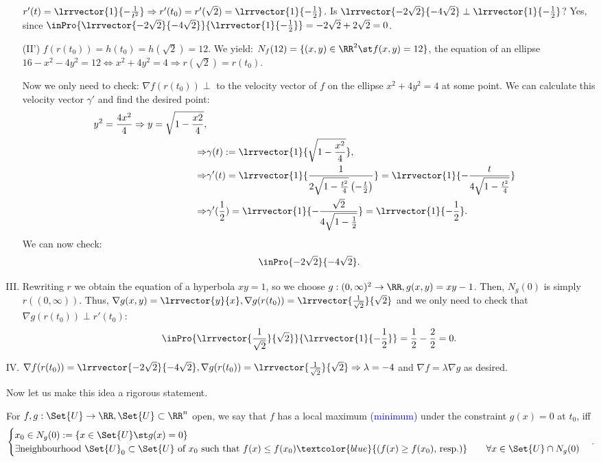 \begin{exam}
\begin{enumerate}[(I)]
  	$r'(t)=\lrrvector{1}{-\frac{1}{t^2}}\Rightarrow r'(t_0)=r'(\sqrt{2})=\lrrvector{1}{-\frac{1}{2}}$. Is $\lrrvector{-2\sqrt{2}}{-4\sqrt{2}}\perp\lrrvector{1}{-\frac{1}{2}}$?
  	Yes, since $\inPro{\lrrvector{-2\sqrt{2}}{-4\sqrt{2}}}{\lrrvector{1}{-\frac{1}{2}}}=-2\sqrt{2}+2\sqrt{2}=0$.
  	\item[(II')] $f(r(t_0))=h(t_0)=h(\sqrt{2})=12$. We yield: $N_f(12)=\{(x,y)\in\RR^2\st f(x,y)=12\}$, the equation of an ellipse $16-x^2-4y^2=12\Leftrightarrow x^2+4y^2=4\Rightarrow r(\sqrt{2})=r(t_0)$.\par 
  	Now we only need to check: $\nabla f(r(t_0))\perp$ to the velocity vector of $f$ on the ellipse $x^2+4y^2=4$ at some point. We can calculate this velocity vector $\gamma'$ and find the desired point: 
  	\begin{align*}
  	  y^2=\frac{4x^2}{4}\Rightarrow y=\sqrt{1-\frac{x2}{4}}, \\\Rightarrow&\gamma(t):=\lrrvector{1}{\sqrt{1-\frac{x^2}{4}}},\\ \Rightarrow&\gamma'(t)=\lrrvector{1}{\frac{1}{2\sqrt{1-\frac{t^2}{4}}\left(-\frac{t}{2}\right)}}=\lrrvector{1}{-\frac{t}{4\sqrt{1-\frac{t^2}{4}}}}\\\Rightarrow& \gamma'(\frac{1}{2})=\lrrvector{1}{-\frac{\sqrt{2}}{4\sqrt{1-\frac{1}{2}}}}=\lrrvector{1}{-\frac{1}{2}}.
  	\end{align*}
  	We can now check:
  	$$\inPro{-2\sqrt{2}}{-4\sqrt{2}}.$$
  	\item Rewriting $r$ we obtain the equation of a hyperbola $xy=1$, so we choose $g:(0,\infty)^2\to\RR, g(x,y)=xy-1$. Then, $N_g(0)$ is simply $r((0,\infty))$. Thus, $\nabla g(x,y)=\lrrvector{y}{x}, \nabla g(r(t_0))=\lrrvector{\frac{1}{\sqrt{2}}}{\sqrt{2}}$ and we only need to check that $\nabla g(r(t_0))\perp r'(t_0)$:
  	$$\inPro{\lrrvector{\frac{1}{\sqrt{2}}}{\sqrt{2}}}{\lrrvector{1}{-\frac{1}{2}}}=\frac{1}{2}-\frac{2}{2}=0.$$
  	\item $\nabla f(r(t_0))=\lrrvector{-2\sqrt{2}}{-4\sqrt{2}}, \nabla g(r(t_0))=\lrrvector{\frac{1}{\sqrt{2}}}{\sqrt{2}}\Rightarrow \lambda=-4$ and $\nabla f=\lambda \nabla g$ as desired. 
  \end{enumerate}
\end{exam}
Now let us make this idea a rigorous statement. 
\begin{defn}
  For $f, g:\Set{U}\to\RR, \Set{U}\subset\RR^n$ open, we say that $f$ has a local maximum \textcolor{blue}{(minimum)} under the constraint $g(x)=0$ at $t_0$, iff $$\begin{cases}x_0\in N_g(0):=\{x\in\Set{U}\st g(x)=0\}\\
  \exists\text{neighbourhood }\Set{U}_0\subset\Set{U}\text{ of }x_0\text{ such that }f(x)\leq f(x_0)\textcolor{blue}{\left(f(x)\geq f(x_0)\text{, resp.}\right)}\qquad\forall x\in\Set{U}\cap N_g(0)\end{cases}.$$
\end{defn}
